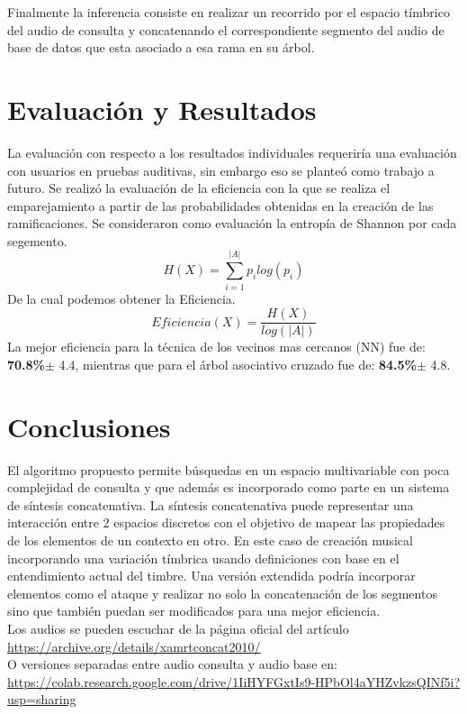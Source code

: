 \documentclass[runningheads]{llncs}
\begin{document}
Finalmente la inferencia consiste en realizar un recorrido por el espacio tímbrico del audio de consulta y concatenando el correspondiente segmento del audio de base de datos que esta asociado a esa rama en su árbol.

\section{Evaluación y Resultados}
La evaluación con respecto a los resultados individuales requeriría una evaluación con usuarios en pruebas auditivas, sin embargo eso se planteó como trabajo a futuro. Se realizó la evaluación de la eficiencia con la que se realiza el emparejamiento a partir de las probabilidades obtenidas en la creación de las ramificaciones. 
Se consideraron como evaluación la entropía de Shannon por cada segemento.
\begin{equation}
	H(X)=\sum_{i=1}^{|A|} p_i log(p_i)
\end{equation}
De la cual podemos obtener la Eficiencia.
\begin{equation}
Eficiencia(X)=\frac{H(X)}{log(|A|)}
\end{equation}
La mejor eficiencia para la técnica de los vecinos mas cercanos (NN) fue de: \textbf{70.8\%}$\pm$ 4.4, mientras que para el árbol asociativo cruzado fue de: \textbf{84.5\%}$\pm$ 4.8.
\section{Conclusiones}

El algoritmo propuesto permite búsquedas en un espacio multivariable con poca complejidad de consulta y que además es incorporado como parte en un sistema de síntesis concatenativa.
La síntesis concatenativa puede representar una interacción entre 2 espacios discretos con el objetivo de mapear las propiedades de los elementos de un contexto en otro. En este caso de creación musical incorporando una variación tímbrica usando definiciones con base en el entendimiento actual del timbre.
Una versión extendida podría incorporar elementos como el ataque y realizar no solo la concatenación de los segmentos sino que también puedan ser modificados para una mejor eficiencia.\\

Los audios se pueden escuchar de la página oficial del artículo\\
\url{https://archive.org/details/xamrtconcat2010/}\\
O versiones separadas entre audio consulta y audio base en:\\ \url{https://colab.research.google.com/drive/1IiHYFGxtIs9-HPbOl4aYHZvkzsQINf5i?usp=sharing}


\end{document}
